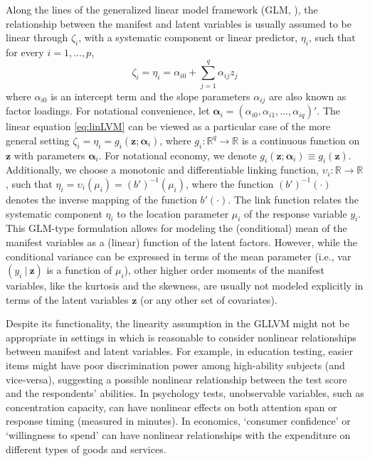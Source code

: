 \documentclass[11pt, a4paper]{article}
\newcommand{\R}{{\ensuremath{\mathbb{R}}}}
\newcommand{\cond}{\!~|~\!}
\begin{document}
Along the lines of the generalized linear model framework (GLM, \citealp{Nelder&Wedderburn_JofRSS1972, MN1989}), the relationship between the manifest and latent variables is usually assumed to be linear through $\zeta_i$, with a systematic component or linear predictor, $\eta_i$, such that for every $i=1,...,p$,
\begin{equation}
  \zeta_i = \eta_i = \alpha_{i0} + \sum_{j=1}^q \alpha_{ij} z_j \label{eq:linLVM}
\end{equation}
where $\alpha_{i0}$ is an intercept term and the slope parameters $\alpha_{ij}$ are also known as factor loadings. For notational convenience, let $\bm{\alpha}_i = (\alpha_{i0}, \alpha_{i1},..., \alpha_{iq})'$. The linear equation \eqref{eq:linLVM} can be viewed as a particular case of the more general setting $\zeta_i = \eta_i = g_i(\mathbf{z}; \bm{\alpha}_i)$, where $g_i:\R^{q} \to \R$ is a continuous function on $\mathbf{z}$ with parameters $\bm{\alpha}_i$. For notational economy, we denote $g_i(\mathbf{z}; \bm{\alpha}_i) \equiv g_i(\mathbf{z})$. Additionally, we choose a monotonic and differentiable linking function, $\upsilon_i:\R \to \R$, such that $\eta_i = \upsilon_i(\mu_i) = (b')^{-1}(\mu_i)$, where the function $(b')^{-1}(\cdot)$ denotes the inverse mapping of the function $b'(\cdot)$. The link function relates the systematic component $\eta_i$ to the location parameter $\mu_i$ of the response variable $y_i$. This GLM-type formulation allows for modeling the (conditional) mean of the manifest variables as a (linear) function of the latent factors. However, while the conditional variance can be expressed in terms of the mean parameter (i.e., var$(y_i\cond\mathbf{z})$ is a function of $\mu_i$), other higher order moments of the manifest variables, like the kurtosis and the skewness, are usually not modeled explicitly in terms of the latent variables $\mathbf{z}$ (or any other set of covariates).

Despite its functionality, the linearity assumption in the GLLVM might not be appropriate in settings in which is reasonable to consider nonlinear relationships between manifest and latent variables. For example, in education testing, easier items might have poor discrimination power among high-ability subjects (and vice-versa), suggesting a possible nonlinear relationship between the test score and the respondents' abilities. In psychology tests, unobservable variables, such as concentration capacity, can have nonlinear effects on both attention span or response timing (measured in minutes). In economics, `consumer confidence' or `willingness to spend' can have nonlinear relationships with the expenditure on different types of goods and services.
\end{document}
